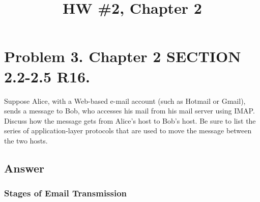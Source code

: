 \documentclass{cshwk}
\begin{document}
\title{HW \#2, Chapter 2}

\maketitle
\section*{Problem 3. Chapter 2 SECTION 2.2-2.5 R16.}

Suppose Alice, with a Web-based e-mail account (such as Hotmail or Gmail), sends a message to Bob, who accesses his mail from his mail server using IMAP. Discuss how the message gets from Alice’s host to Bob’s host. Be sure to list the series of application-layer protocols that are used to move the message between the two hosts.

\subsection*{Answer}


\subsubsection*{Stages of Email Transmission}
\end{document}
